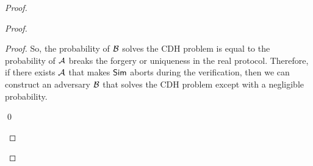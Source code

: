 \begin{proof}
\begin{proof}
\begin{proof}
			So, the probability of $ \mathcal{B} $ solves the CDH problem is equal to the probability of $ \mathcal{A} $ breaks the forgery or uniqueness in the real protocol. Therefore,  if there exists $ \mathcal{A} $ that makes $ \mathsf{Sim}$ aborts during the verification, then we can construct an adversary $ \mathcal{B} $ that solves the CDH problem except with a negligible probability.
			
			
			\qed	  
		\end{proof}
		
	\end{proof}
\end{proof}
